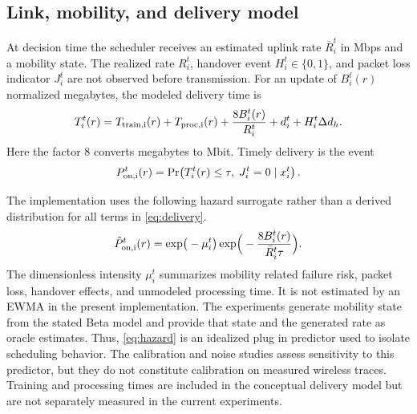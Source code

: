 \documentclass[preprint,12pt]{elsarticle}
\begin{document}
\subsection{Link, mobility, and delivery model}
At decision time the scheduler receives an estimated uplink rate $\bar R_i^t$ in Mbps and a mobility state. The realized rate $R_i^t$, handover event $H_i^t\in\{0,1\}$, and packet loss indicator $J_i^t$ are not observed before transmission. For an update of $B_i^t(r)$ normalized megabytes, the modeled delivery time is
\begin{equation}
T_i^t(r)=T_{\rm train,i}(r)+T_{\rm proc,i}(r)+\frac{8B_i^t(r)}{R_i^t}+d_i^t+H_i^t\Delta d_h.
\label{eq:delivery}
\end{equation}
Here the factor 8 converts megabytes to Mbit. Timely delivery is the event
\begin{equation}
P_{\rm on,i}^t(r)=\Pr\!\left(T_i^t(r)\le\tau,\;J_i^t=0\mid x_i^t\right).
\label{eq:pon}
\end{equation}

The implementation uses the following hazard surrogate rather than a derived distribution for all terms in \eqref{eq:delivery}.
\begin{equation}
\hat P_{\rm on,i}^t(r)=\exp\!\big(-\mu_i^t\big)\exp\!\Big(-\frac{8B_i^t(r)}{\bar R_i^t\tau}\Big).
\label{eq:hazard}
\end{equation}
The dimensionless intensity $\mu_i^t$ summarizes mobility related failure risk, packet loss, handover effects, and unmodeled processing time. It is not estimated by an EWMA in the present implementation. The experiments generate mobility state from the stated Beta model and provide that state and the generated rate as oracle estimates. Thus, \eqref{eq:hazard} is an idealized plug in predictor used to isolate scheduling behavior. The calibration and noise studies assess sensitivity to this predictor, but they do not constitute calibration on measured wireless traces. Training and processing times are included in the conceptual delivery model but are not separately measured in the current experiments.
\end{document}
